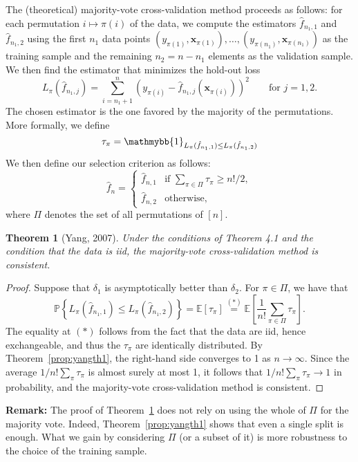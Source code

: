 \documentclass[12pt, letter paper]{article}
\newcommand{\1}{\mathmybb{1}}
\newtheorem{theorem}[proposition]{Theorem}
\newcommand{\0}{\emptyset}
\newcommand{\prob}{\mathbb{P}}
\newcommand{\Ep}[1]{\mathbb{E}\left[ #1 \right]}
\newcommand{\paren}[1]{\left(#1 \right)}
\newcommand{\set}[1]{\left\{ #1 \right\}}
\newcommand{\ind}[1]{\mathmybb{1}_{#1}}
\newcommand{\x}{\boldsymbol{x}}
\newcommand{\fhat}[2]{\hat{f}_{#1, #2}}
\begin{document}
The (theoretical) majority-vote cross-validation method proceeds as follows: for each permutation \(i\mapsto\pi(i)\) of the data, we compute the estimators \(\fhat{n_{1}}{1}\) and \(\fhat{n_{1}}{2}\) using the first \(n_{1}\) data points \((y_{\pi(1)}, \x_{\pi(1)}), \ldots,(y_{\pi(n_1)}, \x_{\pi(n_1)})\) as the training sample and the remaining \(n_{2}=n-n_{1}\) elements as the validation sample. We then find the estimator that minimizes the hold-out loss
\[L_{\pi}(\fhat{n_{1}}{j}) = \sum_{i=n_{1}+1}^{n}\paren{y_{\pi(i)} - \fhat{n_{1}}{j}\paren{\x_{\pi(i)}}}^{2}\qquad \text{for }j=1,2.\]
The chosen estimator is the one favored by the majority of the permutations. More formally, we define 
\[\tau_{\pi} = \ind{L_{\pi}(\fhat{n_{1}}{1}) \leq L_{\pi}(\fhat{n_{1}}{2})}\]
We then define our selection criterion as follows:
\[\hat{f}_{n} = \begin{cases}
    \fhat{n}{1} &\text{if }\sum_{\pi\in\Pi}\tau_{\pi} \geq {n!}/{2},\\[2mm]
    \fhat{n}{2} &\text{otherwise,}
\end{cases}\]
where \(\Pi\) denotes the set of all permutations of \([n]\).

\begin{theorem}[Yang, 2007]\label{prop:yangth2}
    Under the conditions of Theorem 4.1 and the condition that the data is iid, the majority-vote cross-validation method is consistent.
\end{theorem}

\begin{proof}
    Suppose that \(\delta_{1}\) is asymptotically better than \(\delta_{2}\). For \(\pi\in \Pi\), we have that
    \[\prob\set{L_{\pi}\paren{\fhat{n_{1}}{1}} \leq L_{\pi}\paren{\fhat{n_{1}}{2}}} = \Ep{\tau_{\pi}} \stackrel{(*)}{=} \Ep{\frac{1}{n!}\sum_{\pi\in\Pi}\tau_{\pi}}.\]
    The equality at \((*)\) follows from the fact that the data are iid, hence exchangeable, and thus the \(\tau_\pi\) are identically distributed. By Theorem~\ref{prop:yangth1}, the right-hand side converges to 1 as \(n\to\infty\). Since the average \(1/n! \sum_{\pi}\tau_{\pi}\) is almost surely at most 1, it follows that \(1/n! \sum_{\pi}\tau_{\pi} \to 1\) in probability, and the majority-vote cross-validation method is consistent.
\end{proof}

\textbf{Remark:} The proof of Theorem~\ref{prop:yangth2} does not rely on using the whole of \(\Pi\) for the majority vote. Indeed, Theorem~\ref{prop:yangth1} shows that even a single split is enough. What we gain by considering \(\Pi\) (or a subset of it) is more robustness to the choice of the training sample.
 


\newpage
\printbibliography{}
\end{document}
